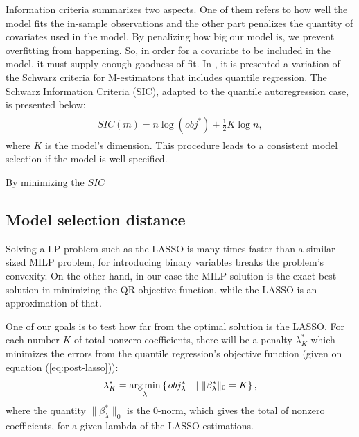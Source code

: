 Information criteria summarizes two aspects. One of them refers to how well the model fits the in-sample observations and the other part penalizes the quantity of covariates used in the model. By penalizing how big our model is, we prevent overfitting from happening. So, in order for a covariate to be included in the model, it must supply enough goodness of fit.
In \cite{machado1993robust}, it is presented a variation of the Schwarz criteria for M-estimators that includes quantile regression. The Schwarz Information Criteria (SIC), adapted to the quantile autoregression case, is presented below:
\begin{align} 
\begin{split}
SIC(m) = n \log({obj}^*)+\frac{1}{2}K\log n,\label{eq:SIC}
\end{split}					
\end{align}
where $K$ is the model's dimension. This procedure leads to a consistent model selection if the model is well specified. 

By minimizing the $SIC$ 

\subsection{Model selection distance}
%


Solving a LP problem such as the LASSO is many times faster than a similar-sized MILP problem, for introducing binary variables breaks the problem's convexity. On the other hand, in our case the MILP solution is the exact best solution in minimizing the QR objective function, while the LASSO is an approximation of that.

One of our goals is to test how far from the optimal solution is the LASSO.
For each number $K$ of total nonzero coefficients, there will be a penalty $\lambda^*_K$ which minimizes the errors from the quantile regression's objective function (given on equation (\ref{eq:post-lasso})): 
\begin{equation}
\lambda^*_K = \operatorname*{arg\,min}_\lambda \left\lbrace \left.  obj_{\lambda}^{*} \quad  \right| \, \| \beta^*_\lambda \|_0 = K \right\rbrace,
\end{equation}
where the quantity $\| \beta^*_\lambda \|_0$ is the $0$-norm, which gives the total of nonzero coefficients, for a given lambda of the LASSO estimations.

